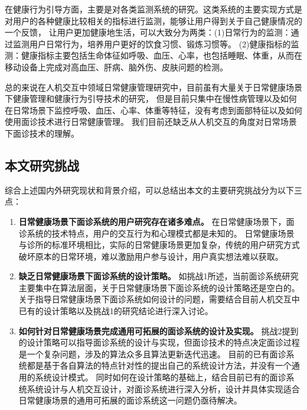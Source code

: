 在健康行为引导方面，主要是对各类监测系统的研究。这类系统的主要实现方式是对用户的各种健康比较相关的指标进行监测，能够让用户得到关于自己健康情况的一个反馈，
让用户更加健康地生活，可以大致分为两类：(1)日常行为的监测：通过监测用户日常行为，培养用户更好的饮食习惯、锻炼习惯等\cite{purpura2011fit4life, Inagawa2013A,bravata2007using,cordeiro2015barriers,lin2006fish, miller2014stepstream}。
(2)健康指标的监测：健康指标主要包括生命体征如呼吸、血压、心率，也包括睡眠、体重，从而在移动设备上完成对高血压、肝病、脑外伤、皮肤问题的检测\cite{liang2020oralcam, wang2018seismo, mariakakis2017biliscreen}。

总的来说在人机交互中领域日常健康管理研究中，目前虽有大量关于日常健康场景下健康管理和健康行为引导技术的研究，
但是目前只集中在慢性病管理以及如何在日常场景下监控呼吸、血压、心率、体重等特征，没有考虑到面部特征以及如何使用面诊技术进行日常健康管理。
我们目前还缺乏从人机交互的角度对日常场景下面诊技术的理解。



\subsection{本文研究挑战}
综合上述国内外研究现状和背景介绍，可以总结出本文的主要研究挑战分为以下三点：
\begin{enumerate}
    \item \textbf{日常健康场景下面诊系统的用户研究存在诸多难点。}
    在日常健康场景下，面诊系统的技术特点，用户的交互行为和心理模式都是未知的。
    日常健康场景与诊所的标准环境相比，实际的日常健康场景更加复杂，传统的用户研究方式破坏原本的日常环境，难以激励用户参与设计，用户真实想法难以获取。

\item \textbf{缺乏日常健康场景下面诊系统的设计策略。}
    如挑战1所述，当前面诊系统研究主要集中在算法层面，关于日常健康场景下面诊系统的设计策略还是空白的。
    关于指导日常健康场景下面诊系统如何设计的问题，需要结合目前人机交互中已有的设计策略以及挑战1的研究结论进行深入讨论。

\item \textbf{如何针对日常健康场景完成通用可拓展的面诊系统的设计及实现。}
    挑战2提到的设计策略可以指导面诊系统的设计与实现，但面诊技术的特点决定面诊过程是一个复杂问题，涉及的算法众多且算法更新迭代迅速。
    目前的已有面诊系统都是基于各自算法的特点针对性的提出自己的系统设计方法，并没有一个通用的系统设计模式。
    同时如何在设计策略的基础上，结合目前已有的面诊系统系统设计与人机交互设计，对面诊系统进行深入分析，设计并具体实现适合日常健康场景的通用可拓展的面诊系统这一问题仍亟待解决。
    
\end{enumerate}
